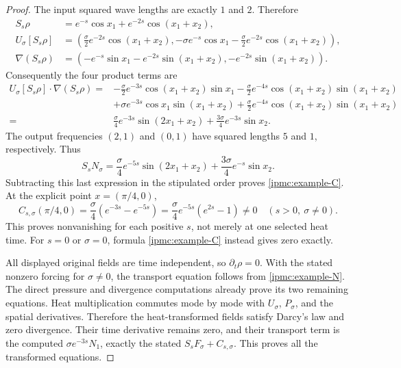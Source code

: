 \begin{proof}
The input squared wave lengths are exactly \(1\) and \(2\). Therefore
\begin{align*}
 S_s\rho
   &=e^{-s}\cos x_1+e^{-2s}\cos(x_1+x_2),\\
 U_\sigma[S_s\rho]
   &=\left(\frac\sigma2e^{-2s}\cos(x_1+x_2),
           -\sigma e^{-s}\cos x_1
                      -\frac\sigma2e^{-2s}\cos(x_1+x_2)\right),\\
 \nabla(S_s\rho)
   &=\left(-e^{-s}\sin x_1-e^{-2s}\sin(x_1+x_2),
                                 -e^{-2s}\sin(x_1+x_2)\right).
\end{align*}
Consequently the four product terms are
\begin{align*}
 U_\sigma[S_s\rho]\cdot\nabla(S_s\rho)
 ={}&-\frac\sigma2 e^{-3s}\cos(x_1+x_2)\sin x_1
      -\frac\sigma2 e^{-4s}\cos(x_1+x_2)\sin(x_1+x_2)\\
    &+\sigma e^{-3s}\cos x_1\sin(x_1+x_2)
      +\frac\sigma2 e^{-4s}\cos(x_1+x_2)\sin(x_1+x_2)\\
 ={}&\frac\sigma4e^{-3s}\sin(2x_1+x_2)
                      +\frac{3\sigma}{4}e^{-3s}\sin x_2.
\end{align*}
The output frequencies \((2,1)\) and \((0,1)\) have squared lengths
\(5\) and \(1\), respectively. Thus
\[
 S_sN_\sigma=\frac\sigma4e^{-5s}\sin(2x_1+x_2)
                    +\frac{3\sigma}{4}e^{-s}\sin x_2.
\]
Subtracting this last expression in the stipulated order proves
\eqref{ipmc:example-C}. At the explicit point \(x=(\pi/4,0)\),
\[
 C_{s,\sigma}(\pi/4,0)
       =\frac\sigma4(e^{-3s}-e^{-5s})
       =\frac\sigma4e^{-5s}(e^{2s}-1)\ne0
       \quad(s>0,\ \sigma\ne0).
\]
This proves nonvanishing for each positive \(s\), not merely at one
selected heat time. For \(s=0\) or \(\sigma=0\), formula \eqref{ipmc:example-C}
instead gives zero exactly.

All displayed original fields are time independent, so
\(\partial_t\rho=0\). With the stated nonzero forcing for
\(\sigma\ne0\), the transport equation follows from \eqref{ipmc:example-N}.
The direct pressure and divergence computations already prove its two
remaining equations. Heat multiplication commutes mode by mode with
\(U_\sigma\), \(P_\sigma\), and the spatial derivatives. Therefore the
heat-transformed fields satisfy Darcy's law and zero divergence. Their
time derivative remains zero, and their transport term is the computed
\(\sigma e^{-3s}N_1\), exactly the stated
\(S_sF_\sigma+C_{s,\sigma}\). This proves all the transformed equations.
\end{proof}


